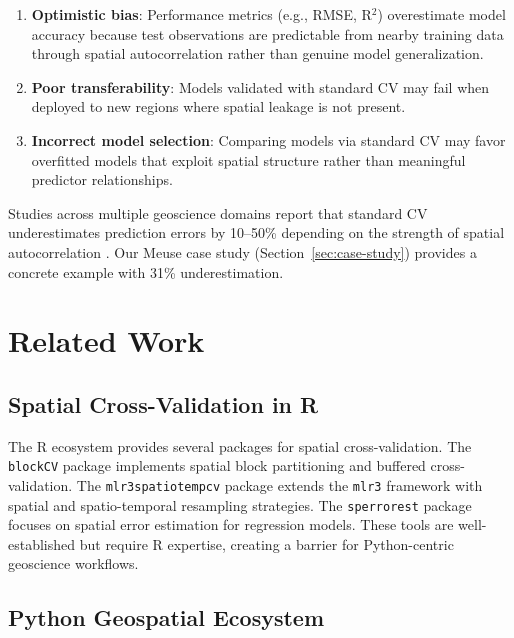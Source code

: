 \documentclass[a4paper,fleqn]{cas-sc}
\begin{document}
\begin{enumerate}
\item \textbf{Optimistic bias}: Performance metrics (e.g., RMSE, R$^2$) overestimate model accuracy because test observations are predictable from nearby training data through spatial autocorrelation rather than genuine model generalization.
\item \textbf{Poor transferability}: Models validated with standard CV may fail when deployed to new regions where spatial leakage is not present.
\item \textbf{Incorrect model selection}: Comparing models via standard CV may favor overfitted models that exploit spatial structure rather than meaningful predictor relationships.
\end{enumerate}

Studies across multiple geoscience domains report that standard CV underestimates prediction errors by 10--50\% depending on the strength of spatial autocorrelation \citep{meyer2018improving, ploton2020spatial, wadoux2021spatial}. Our Meuse case study (Section~\ref{sec:case-study}) provides a concrete example with 31\% underestimation.


\section{Related Work}
\label{sec:related}

\subsection{Spatial Cross-Validation in R}

The R ecosystem provides several packages for spatial cross-validation. The \texttt{blockCV} package \citep{valavi2019blockcv} implements spatial block partitioning and buffered cross-validation. The \texttt{mlr3spatiotempcv} package \citep{schratz2019hyperparameter} extends the \texttt{mlr3} framework with spatial and spatio-temporal resampling strategies. The \texttt{sperrorest} package \citep{brenning2012spatial} focuses on spatial error estimation for regression models. These tools are well-established but require R expertise, creating a barrier for Python-centric geoscience workflows.

\subsection{Python Geospatial Ecosystem}
\end{document}
